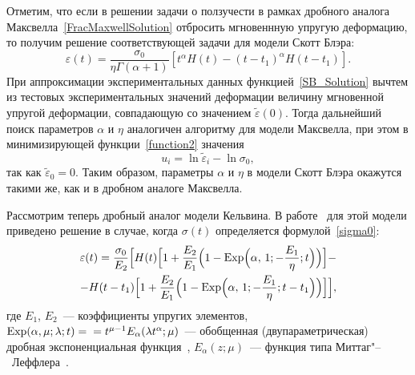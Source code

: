 Отметим, что если в решении задачи о ползучести в рамках дробного аналога Максвелла~\eqref{FracMaxwellSolution} отбросить мгновеннную упругую деформацию, то получим решение   соответствующей задачи для модели Скотт Блэра:
\begin{equation} \label{SB_Solution}
\varepsilon(t)=\frac{\sigma_{0}}{\eta\Gamma(\alpha+1)}[t^{\alpha}H(t)-(t-t_{1})^{\alpha}H(t-t_{1})].
\end{equation}
При аппроксимации экспериментальных данных функцией~\eqref{SB_Solution} вычтем из тестовых экспериментальных значений деформации величину мгновенной упругой деформации, совпадающую со значением $\tilde{\varepsilon}(0)$. Тогда дальнейший поиск параметров $\alpha$ и $\eta$ аналогичен алгоритму для модели Максвелла, при этом в минимизирующей функции~\eqref{function2} значения
\begin{equation}\label{u_i}
u_{i}=\ln\tilde{\varepsilon}_{i}-\ln\sigma_{0},
\end{equation}
так как $\tilde{\varepsilon}_{0}=0$. Таким образом, параметры $\alpha$ и $\eta$ в модели Скотт Блэра окажутся такими же, как и в дробном аналоге Максвелла.

Рассмотрим теперь дробный аналог модели Кельвина. В работе~\cite{OgoRadUng16} для этой модели приведено
решение в случае, когда $\sigma(t)$ определяется формулой~\eqref{sigma0}:
\begin{multline}
\label{FracKelvinSolution}
\varepsilon(t)=\frac{\sigma_{0}}{E_{2}}\Bigl[H(t)\Bigl[1+\frac{E_{2}}{E_{1}}\Bigl(1-{\rm Exp}\Bigl(\alpha,\,1;-\frac{E_{1}}{\eta};t\Bigl)\Bigr)\Bigr]-\\
-H(t-t_{1})\Bigl[1+\frac{E_{2}}{E_{1}}\Bigr(1-{\rm Exp}\Bigl(\alpha,\,1;-\frac{E_{1}}{\eta};t-t_{1}\Bigl)\Bigr)\Bigr]\Bigr],
\end{multline}
где $E_{1}$, $E_{2}$~--- коэффициенты упругих элементов, ${\rm Exp}(\alpha,\mu;\lambda;t)=\\=t^{\mu-1}E_{\alpha}(\lambda t^{\alpha};\mu)$~--- обобщенная (двупараметрическая) дробная экспоненциальная функция~\cite{Ogorodnikov_Some_Special_Functions},
 $E_{\alpha}(z;\mu)$~--- функция типа Миттаг"--~Леффлера~\cite{Djrbashyan1966}.

